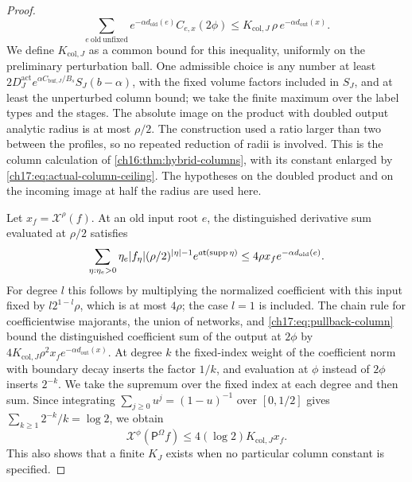 \begin{proof}
\begin{equation}\label{ch17:eq:pullback-column}
 \sum_{e\ \mathrm{old\ unfixed}}e^{-\alpha d_{\mathrm{old}}(e)}C_{e,x}(2\phi)\le K_{\mathrm{col},J}\,\rho\,e^{-\alpha d_{\mathrm{out}}(x)}.
\end{equation}
We define $K_{\mathrm{col},J}$ as a common bound for this inequality, uniformly on the preliminary perturbation ball. One admissible choice is any number at least $2D_J^{\mathrm{act}}e^{\alpha C_{\mathrm{buf},J}/B_s}S_J(b-\alpha)$, with the fixed volume factors included in $S_J$, and at least the unperturbed column bound; we take the finite maximum over the label types and the stages. The absolute image on the product with doubled output analytic radius is at most $\rho/2$. The construction used a ratio larger than two between the profiles, so no repeated reduction of radii is involved. This is the column calculation of \cref{ch16:thm:hybrid-columns}, with its constant enlarged by \eqref{ch17:eq:actual-column-ceiling}. The hypotheses on the doubled product and on the incoming image at half the radius are used here.

Let $x_f=\mathcal X^\rho(f)$. At an old input root $e$, the distinguished derivative sum evaluated at $\rho/2$ satisfies
\begin{equation}\label{ch17:eq:half-derivative}
 \sum_{\eta:\eta_e>0}\eta_e\lvert f_\eta\rvert(\rho/2)^{\lvert \eta\rvert-1}e^{a\mathsf t(\operatorname{supp}\eta)}\le4\rho x_fe^{-\alpha d_{\mathrm{old}}(e)}.
\end{equation}
For degree $l$ this follows by multiplying the normalized coefficient with this input fixed by $l2^{1-l}\rho$, which is at most $4\rho$; the case $l=1$ is included. The chain rule for coefficientwise majorants, the union of networks, and \eqref{ch17:eq:pullback-column} bound the distinguished coefficient sum of the output at $2\phi$ by $4K_{\mathrm{col},J}\rho^2x_fe^{-\alpha d_{\mathrm{out}}(x)}$. At degree $k$ the fixed-index weight of the coefficient norm with boundary decay inserts the factor $1/k$, and evaluation at $\phi$ instead of $2\phi$ inserts $2^{-k}$. We take the supremum over the fixed index at each degree and then sum. Since integrating $\sum_{j\ge0}u^j=(1-u)^{-1}$ over $[0,1/2]$ gives $\sum_{k\ge1}2^{-k}/k=\log2$, we obtain
\[
 \mathcal X^\phi(\mathsf P^\Omega f)\le4(\log2)K_{\mathrm{col},J}x_f.
\]
This also shows that a finite $K_J$ exists when no particular column constant is specified.


\end{proof}
